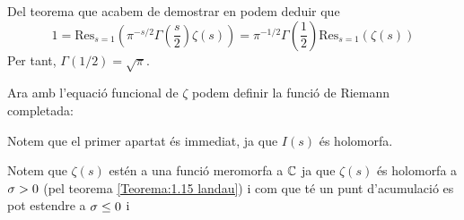 Del teorema que acabem de demostrar en podem deduir que
\[
    1=\mathrm{Res}_{s=1}\left(\pi^{-s/2}\Gamma\left(\frac{s}{2}\right)\zeta(s)\right)=
    \pi^{-1/2}
    \Gamma\left(\frac{1}{2}\right)
    \mathrm{Res}_{s=1}\left(
    \zeta(s)
    \right)
\]
Per tant, $\Gamma(1/2)=\sqrt{\pi}$.\par
Ara amb l'equació funcional de $\zeta$ podem definir la funció de Riemann completada:
\begin{pf}
    Notem que el primer apartat és immediat, ja que $I(s)$ és holomorfa.\par
    Notem que $\zeta(s)$ estén a una funció meromorfa a $\mathbb C$ ja que $\zeta(s)$ és holomorfa a $\sigma>0$ (pel teorema \ref{Teorema:1.15 landau}) i com que té un punt d'acumulació es pot estendre a $\sigma\leq 0$ i 
\end{pf}